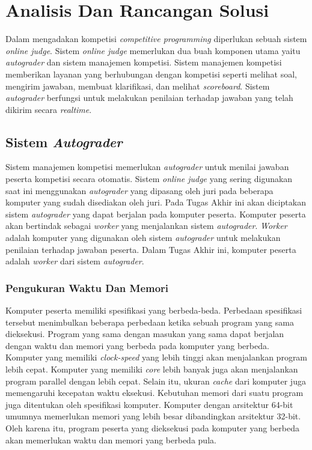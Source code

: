 \chapter{Analisis Dan Rancangan Solusi}

\par Dalam mengadakan kompetisi \textit{competitive programming} diperlukan sebuah sistem \textit{online judge}. Sistem \textit{online judge} memerlukan dua buah komponen utama yaitu \textit{autograder} dan sistem manajemen kompetisi. Sistem manajemen kompetisi memberikan layanan yang berhubungan dengan kompetisi seperti melihat soal, mengirim jawaban, membuat klarifikasi, dan melihat \textit{scoreboard}. Sistem \textit{autograder} berfungsi untuk melakukan penilaian terhadap jawaban yang telah dikirim secara \textit{realtime}.

\section{Sistem \textit{Autograder}}

\par Sistem manajemen kompetisi memerlukan \textit{autograder} untuk menilai jawaban peserta kompetisi secara otomatis. Sistem \textit{online judge} yang sering digunakan saat ini menggunakan \textit{autograder} yang dipasang oleh juri pada beberapa komputer yang sudah disediakan oleh juri. Pada Tugas Akhir ini akan diciptakan sistem \textit{autograder} yang dapat berjalan pada komputer peserta. Komputer peserta akan bertindak sebagai \textit{worker} yang menjalankan sistem \textit{autograder}. \textit{Worker} adalah komputer yang digunakan oleh sistem \textit{autograder} untuk melakukan penilaian terhadap jawaban peserta. Dalam Tugas Akhir ini, komputer peserta adalah \textit{worker} dari sistem \textit{autograder}.

\subsection{Pengukuran Waktu Dan Memori} \label{subsec:time-memory-measure}

\par Komputer peserta memiliki spesifikasi yang berbeda-beda. Perbedaan spesifikasi tersebut menimbulkan beberapa perbedaan ketika sebuah program yang sama dieksekusi. Program yang sama dengan masukan yang sama dapat berjalan dengan waktu dan memori yang berbeda pada komputer yang berbeda. Komputer yang memiliki \textit{clock-speed} yang lebih tinggi akan menjalankan program lebih cepat. Komputer yang memiliki \textit{core} lebih banyak juga akan menjalankan program parallel dengan lebih cepat. Selain itu, ukuran \textit{cache} dari komputer juga memengaruhi kecepatan waktu eksekusi. Kebutuhan memori dari suatu program juga ditentukan oleh spesifikasi komputer. Komputer dengan arsitektur 64-bit umumnya memerlukan memori yang lebih besar dibandingkan arsitektur 32-bit. Oleh karena itu, program peserta yang dieksekusi pada komputer yang berbeda akan memerlukan waktu dan memori yang berbeda pula.

